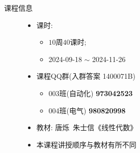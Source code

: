 \begin{frame}[<*>]{课程信息}
	\begin{figure}[bpt]
		\begin{minipage}{.65\textwidth}
			\begin{itemize}
				\item 课时:
					\begin{itemize}
						\item $10$周$40$课时;
						\item 2024-09-18 $\sim$ 2024-11-26
					\end{itemize}
				\item 课程QQ群(入群答案 1400071B)
					\begin{itemize}
						\item 003班(自动化) \alert{\textbf{973042523}}
						\item 004班(电气) \alert{\textbf{980820998}}
					\end{itemize}
				\item 教材: 唐烁\ 朱士信《线性代数》
				\item \alert{本课程讲授顺序与教材有所不同}
			\end{itemize}
		\end{minipage}
		\begin{minipage}{.3\textwidth}
		\end{minipage}
	\end{figure}
\end{frame}


